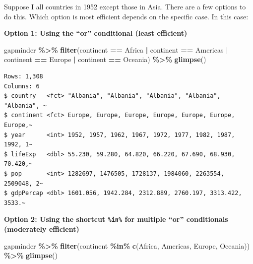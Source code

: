 \documentclass[
]{book}
\makeatletter
\newenvironment{Shaded}{\begin{snugshade}}{\end{snugshade}}
\newcommand{\FunctionTok}[1]{\textcolor[rgb]{0.27,0.27,0.27}{\textbf{#1}}}
\newcommand{\NormalTok}[1]{#1}
\newcommand{\SpecialCharTok}[1]{\textcolor[rgb]{0.43,0.43,0.43}{\textbf{#1}}}
\newcommand{\StringTok}[1]{\textcolor[rgb]{0.5,0.5,0.5}{#1}}
\newenvironment{kframe}{%
\medskip{}
\setlength{\fboxsep}{.8em}
 \def\at@end@of@kframe{}%
 \ifinner\ifhmode%
  \def\at@end@of@kframe{\end{minipage}}%
  \begin{minipage}{\columnwidth}%
 \fi\fi%
 \def\FrameCommand##1{\hskip\@totalleftmargin \hskip-\fboxsep
 \colorbox{shadecolor}{##1}\hskip-\fboxsep
     \hskip-\linewidth \hskip-\@totalleftmargin \hskip\columnwidth}%
 \MakeFramed {\advance\hsize-\width
   \@totalleftmargin\z@ \linewidth\hsize
   \@setminipage}}%
 {\par\unskip\endMakeFramed%
 \at@end@of@kframe}
\renewenvironment{Shaded}{\begin{kframe}}{\end{kframe}}
\makeatother
\begin{document}
Suppose I all countries in 1952 except those in Asia. There are a few options to do this. Which option is most efficient depends on the specific case. In this case:

\textbf{Option 1: Using the ``or'' conditional \texttt{\textbar{}} (least efficient)}

\begin{Shaded}
\begin{Highlighting}[]
\NormalTok{gapminder }\SpecialCharTok{\%\textgreater{}\%} 
  \FunctionTok{filter}\NormalTok{(continent }\SpecialCharTok{==} \StringTok{\textquotesingle{}Africa\textquotesingle{}} \SpecialCharTok{|}\NormalTok{ continent }\SpecialCharTok{==} \StringTok{\textquotesingle{}Americas\textquotesingle{}} \SpecialCharTok{|}\NormalTok{ continent }\SpecialCharTok{==} \StringTok{\textquotesingle{}Europe\textquotesingle{}} \SpecialCharTok{|}\NormalTok{ continent }\SpecialCharTok{==} \StringTok{\textquotesingle{}Oceania\textquotesingle{}}\NormalTok{) }\SpecialCharTok{\%\textgreater{}\%} 
  \FunctionTok{glimpse}\NormalTok{()}
\end{Highlighting}
\end{Shaded}

\begin{verbatim}
Rows: 1,308
Columns: 6
$ country   <fct> "Albania", "Albania", "Albania", "Albania", "Albania", ~
$ continent <fct> Europe, Europe, Europe, Europe, Europe, Europe, Europe,~
$ year      <int> 1952, 1957, 1962, 1967, 1972, 1977, 1982, 1987, 1992, 1~
$ lifeExp   <dbl> 55.230, 59.280, 64.820, 66.220, 67.690, 68.930, 70.420,~
$ pop       <int> 1282697, 1476505, 1728137, 1984060, 2263554, 2509048, 2~
$ gdpPercap <dbl> 1601.056, 1942.284, 2312.889, 2760.197, 3313.422, 3533.~
\end{verbatim}

\textbf{Option 2: Using the shortcut \texttt{\%in\%} for multiple ``or'' conditionals (moderately efficient)}

\begin{Shaded}
\begin{Highlighting}[]
\NormalTok{gapminder }\SpecialCharTok{\%\textgreater{}\%} 
  \FunctionTok{filter}\NormalTok{(continent }\SpecialCharTok{\%in\%} \FunctionTok{c}\NormalTok{(}\StringTok{\textquotesingle{}Africa\textquotesingle{}}\NormalTok{, }\StringTok{\textquotesingle{}Americas\textquotesingle{}}\NormalTok{, }\StringTok{\textquotesingle{}Europe\textquotesingle{}}\NormalTok{, }\StringTok{\textquotesingle{}Oceania\textquotesingle{}}\NormalTok{)) }\SpecialCharTok{\%\textgreater{}\%} 
  \FunctionTok{glimpse}\NormalTok{()}
\end{Highlighting}
\end{Shaded}
\end{document}
